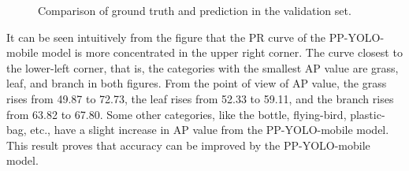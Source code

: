 \documentclass[journal,article,submit,moreauthors,pdftex]{Definitions/mdpi}
\begin{document}
\begin{figure}[htbp]
\centering
{}
\quad
{}
\caption{Comparison of ground truth and prediction in the validation set.}
\label{fig:prc}
\end{figure}

It can be seen intuitively from the figure that the PR curve of the PP-YOLO-mobile model is more concentrated in the upper right corner. 
The curve closest to the lower-left corner, that is, the categories with the smallest AP value are grass, leaf, and branch in both figures.
From the point of view of AP value, the grass rises from 49.87 to 72.73, the leaf rises from 52.33 to 59.11, and the branch rises from 63.82 to 67.80. Some other categories, like the bottle, flying-bird, plastic-bag, etc., have a slight increase in AP value from the PP-YOLO-mobile model. This result proves that accuracy can be improved by the PP-YOLO-mobile model.
\end{document}
